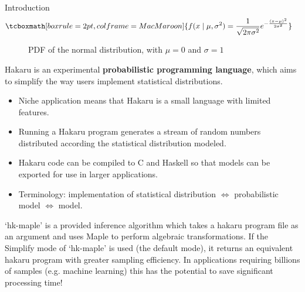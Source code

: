 \documentclass[22pt]{beamer}
\begin{document}
\begin{frame}[fragile]
\begin{textblock}{5}
\begin{block}{Introduction}
\begin{equation*}
\begin{aligned}
& \tcboxmath[boxrule=2pt,colframe=MacMaroon]{f(x \mid \mu, \sigma^2) = \frac{1}{\sqrt{2\pi\sigma^2}} e^{-\frac{(x - \mu)^2}{2\sigma^2}}}
\end{aligned}
\end{equation*}

\begin{figure}
\caption{\tiny{PDF of the normal distribution, with $\mu = 0$ and $\sigma = 1$}}
\end{figure}

\tiny{Hakaru is an experimental \textbf{probabilistic programming language}, which aims to simplify the way users implement statistical distributions. 

\begin{itemize}
    \item Niche application means that Hakaru is a small language with limited features.
    \item Running a Hakaru program generates a stream of random numbers distributed according the statistical distribution modeled.
    \item Hakaru code can be compiled to C and Haskell so that models can be exported for use in larger applications.
    \item Terminology: implementation of statistical distribution $\Longleftrightarrow$ probabilistic model $\Longleftrightarrow$ model.
\end{itemize}

}

\bigskip

\tiny{`hk-maple' is a provided inference algorithm which takes a hakaru program file as an argument and uses Maple to perform algebraic transformations. If the Simplify mode of `hk-maple' is used (the default mode), it returns an equivalent hakaru program with greater sampling efficiency. In applications requiring billions of samples (e.g. machine learning) this has the potential to save significant processing time!}


\end{block}
\end{textblock}
\end{frame}
\end{document}
